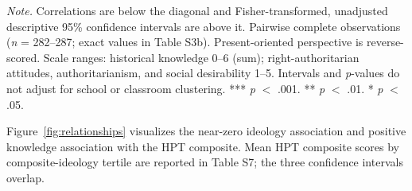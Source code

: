 \documentclass[PCJ,Unicode,screen,mode=plain]{cedram}
\begin{document}
\emph{Note.} Correlations are below the diagonal and Fisher-transformed,
unadjusted descriptive 95\% confidence intervals are above it. Pairwise complete observations (\emph{n} = 282--287; exact values in Table S3b). Present-oriented perspective is reverse-scored. Scale ranges: historical knowledge 0--6 (sum); right-authoritarian attitudes, authoritarianism, and social desirability 1--5. Intervals and \emph{p}-values do not adjust for school or classroom clustering. *** \emph{p} $<$ .001. ** \emph{p} $<$ .01. * \emph{p} $<$ .05.

Figure~\ref{fig:relationships} visualizes the near-zero ideology
association and positive knowledge association with the HPT composite. Mean
HPT composite scores by composite-ideology tertile are reported in Table S7;
the three confidence intervals overlap.
\end{document}

